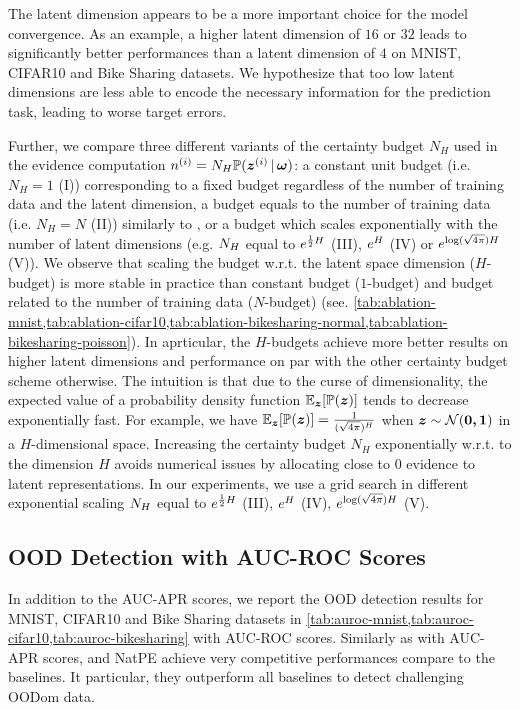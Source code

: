 The latent dimension appears to be a more important choice for the model convergence. As an example, a higher latent dimension of $16$ or $32$ leads to significantly better performances than a latent dimension of $4$ on MNIST, CIFAR10 and Bike Sharing datasets. We hypothesize that too low latent dimensions are less able to encode the necessary information for the prediction task, leading to worse target errors.

Further, we compare three different variants of the certainty budget $N_H$ used in the evidence computation $n^{(i)} = N_H\mathbb{P}(\bm{z}^{(i)} \,|\, \bm{\omega})$: a constant unit budget (i.e. $N_H=1$ (I)) corresponding to a fixed budget regardless of the number of training data and the latent dimension, a budget equals to the number of training data (i.e. $N_H=N$ (II)) similarly to \citet{charpentier2020}, or a budget which scales exponentially with the number of latent dimensions (e.g. $N_H$ equal to $e^{\frac{1}{2}H}$ (III), $e^{H}$ (IV) or $e^{\log(\sqrt{4\pi})H}$ (V)). We observe that scaling the budget w.r.t. the latent space dimension ($H$-budget) is more stable in practice than constant budget ($1$-budget) and budget related to the number of training data ($N$-budget) (see. \cref{tab:ablation-mnist,tab:ablation-cifar10,tab:ablation-bikesharing-normal,tab:ablation-bikesharing-poisson}). In aprticular, the $H$-budgets achieve more  better results on higher latent dimensions and performance on par with the other certainty budget scheme otherwise. The intuition is that due to the curse of dimensionality, the expected value of a probability density function $\operatorname{\mathbb{E}}_{\bm{z}}[\mathbb{P}(\bm{z})]$ tends to decrease exponentially fast. For example, we have $\operatorname{\mathbb{E}}_{\bm{z}}[\mathbb{P}(\bm{z})] = \frac{1}{(\sqrt{4\pi})^H}$ when $\bm{z} \sim \operatorname{\mathcal{N}}(\bm{0, \bm{1}})$ in a $H$-dimensional space. Increasing the certainty budget $N_H$ exponentially w.r.t. to the dimension $H$ avoids numerical issues by allocating close to $0$ evidence to latent representations. In our experiments, we use a grid search in different exponential scaling $N_H$ equal to $e^{\frac{1}{2}H}$ (III), $e^{H}$ (IV),  $e^{\log(\sqrt{4\pi})H}$ (V).

\subsection{OOD Detection with AUC-ROC Scores}
\label{sec:auroc}

In addition to the AUC-APR scores, we report the OOD detection results for MNIST, CIFAR10 and Bike Sharing datasets in \cref{tab:auroc-mnist,tab:auroc-cifar10,tab:auroc-bikesharing} with AUC-ROC scores. Similarly as with AUC-APR scores, \NatPNacro{} and NatPE achieve very competitive performances compare to the baselines. It particular, they outperform all baselines to detect challenging OODom data.


